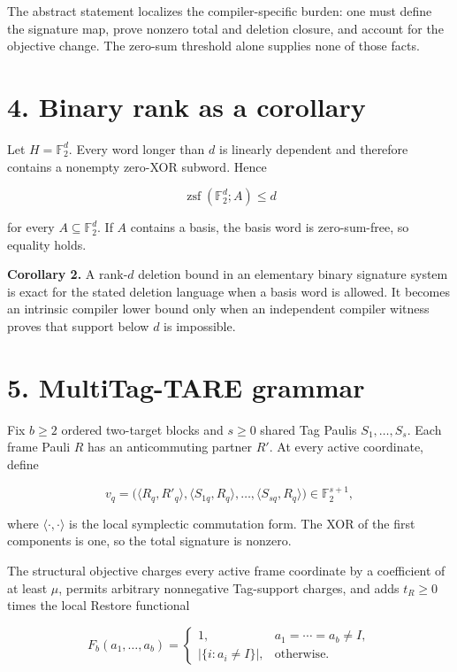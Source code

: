 \documentclass[
  11pt,
]{article}
\begin{document}
The abstract statement localizes the compiler-specific burden: one must
define the signature map, prove nonzero total and deletion closure, and
account for the objective change. The zero-sum threshold alone supplies
none of those facts.

\hypertarget{binary-rank-as-a-corollary}{%
\section{4. Binary rank as a
corollary}\label{binary-rank-as-a-corollary}}

Let \(H=\mathbb F_2^d\). Every word longer than \(d\) is linearly
dependent and therefore contains a nonempty zero-XOR subword. Hence

\[
\operatorname{zsf}(\mathbb F_2^d; A)\le d
\]

for every \(A\subseteq\mathbb F_2^d\). If \(A\) contains a basis, the
basis word is zero-sum-free, so equality holds.

\textbf{Corollary 2.} A rank-\(d\) deletion bound in an elementary
binary signature system is exact for the stated deletion language when a
basis word is allowed. It becomes an intrinsic compiler lower bound only
when an independent compiler witness proves that support below \(d\) is
impossible.

\hypertarget{multitag-tare-grammar}{%
\section{5. MultiTag-TARE grammar}\label{multitag-tare-grammar}}

Fix \(b\ge2\) ordered two-target blocks and \(s\ge0\) shared Tag Paulis
\(S_1, \ldots, S_s\). Each frame Pauli \(R\) has an anticommuting
partner \(R'\). At every active coordinate, define

\[
v_q=\bigl(\langle R_q, R'_q\rangle,
\langle S_{1q}, R_q\rangle, \ldots,
\langle S_{sq}, R_q\rangle\bigr)
\in\mathbb F_2^{s+1},
\]

where \(\langle\cdot, \cdot\rangle\) is the local symplectic commutation
form. The XOR of the first components is one, so the total signature is
nonzero.

The structural objective charges every active frame coordinate by a
coefficient of at least \(\mu\), permits arbitrary nonnegative
Tag-support charges, and adds \(t_R\ge0\) times the local Restore
functional

\[
F_b(a_1, \ldots, a_b)=
\begin{cases}
1, & a_1=\cdots=a_b\ne I, \\
|\{i:a_i\ne I\}|, & \text{otherwise}.
\end{cases}
\]
\end{document}
